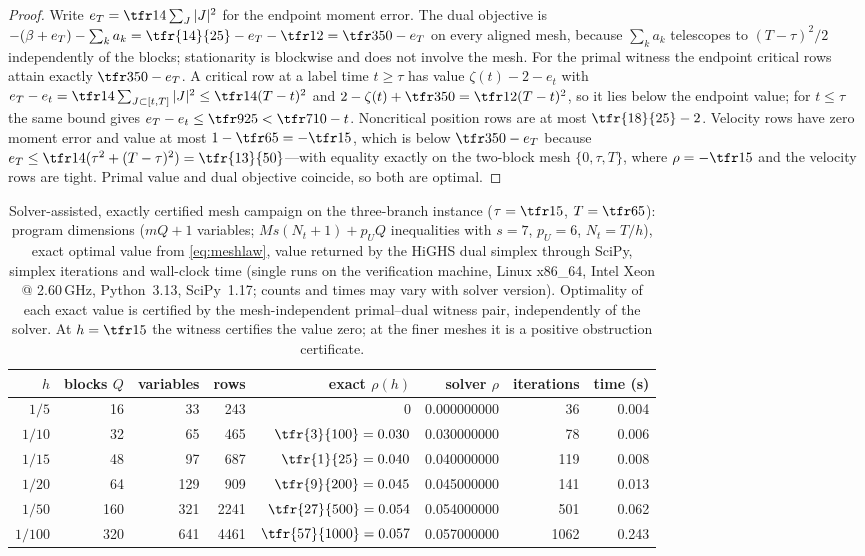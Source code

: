 \begin{proof}
Write $e_T=\tfr14\sum_J|J|^2$ for the endpoint moment error. The dual objective is $-(\beta+e_T)-\sum_ka_k=\tfr{14}{25}-e_T-\tfr12=\tfr3{50}-e_T$ on every aligned mesh, because $\sum_ka_k$ telescopes to $(T-\tau)^2/2$ independently of the blocks; stationarity is blockwise and does not involve the mesh. For the primal witness the endpoint critical rows attain exactly $\tfr3{50}-e_T$. A critical row at a label time $t\ge\tau$ has value $\zeta(t)-2-e_t$ with $e_T-e_t=\tfr14\sum_{J\subset[t,T]}|J|^2\le\tfr14(T-t)^2$ and $2-\zeta(t)+\tfr3{50}=\tfr12(T-t)^2$, so it lies below the endpoint value; for $t\le\tau$ the same bound gives $e_T-e_t\le\tfr9{25}<\tfr7{10}-t$. Noncritical position rows are at most $\tfr{18}{25}-2$. Velocity rows have zero moment error and value at most $1-\tfr65=-\tfr15$, which is below $\tfr3{50}-e_T$ because $e_T\le\tfr14(\tau^2+(T-\tau)^2)=\tfr{13}{50}$---with equality exactly on the two-block mesh $\{0,\tau,T\}$, where $\rho=-\tfr15$ and the velocity rows are tight. Primal value and dual objective coincide, so both are optimal.
\end{proof}

\begin{table}[t]
\centering\small
\caption{Solver-assisted, exactly certified mesh campaign on the three-branch instance ($\tau=\tfr15$, $T=\tfr65$): program dimensions ($mQ+1$ variables; $Ms(N_t{+}1)+p_UQ$ inequalities with $s=7$, $p_U=6$, $N_t=T/h$), exact optimal value from \eqref{eq:meshlaw}, value returned by the HiGHS dual simplex \cite{HuangfuHall2018} through SciPy, simplex iterations and wall-clock time (single runs on the verification machine, Linux x86\_64, Intel Xeon @ 2.60\,GHz, Python~3.13, SciPy~1.17; counts and times may vary with solver version). Optimality of each exact value is certified by the mesh-independent primal--dual witness pair, independently of the solver. At $h=\tfr15$ the witness certifies the value zero; at the finer meshes it is a positive obstruction certificate.}
\label{tab:mesh}
\begin{tabular}{@{}rrrrrrrr@{}}
\toprule
$h$ & blocks $Q$ & variables & rows & exact $\rho(h)$ & solver $\rho$ & iterations & time (s)\\
\midrule
$1/5$   & 16  & 33  & 243  & $0$                    & 0.000000000 & 36   & 0.004\\
$1/10$  & 32  & 65  & 465  & $\tfr{3}{100}=0.030$   & 0.030000000 & 78   & 0.006\\
$1/15$  & 48  & 97  & 687  & $\tfr{1}{25}=0.040$    & 0.040000000 & 119  & 0.008\\
$1/20$  & 64  & 129 & 909  & $\tfr{9}{200}=0.045$   & 0.045000000 & 141  & 0.013\\
$1/50$  & 160 & 321 & 2241 & $\tfr{27}{500}=0.054$  & 0.054000000 & 501  & 0.062\\
$1/100$ & 320 & 641 & 4461 & $\tfr{57}{1000}=0.057$ & 0.057000000 & 1062 & 0.243\\
\bottomrule
\end{tabular}
\end{table}

